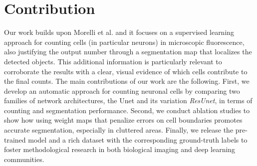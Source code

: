 
\section{Contribution}
\label{sec:contribution}
Our work builds upon Morelli et al. \cite{morelli2021cell_counting} and it focuses on a supervised learning approach for counting cells (in particular neurons) in microscopic fluorescence, also justifying the output number through a segmentation map that localizes the detected objects.  
This additional information is particularly relevant to corroborate the results with a clear, visual evidence of which cells contribute to the final counts.
The main contributions of our work are the following. 
First, we develop an automatic approach for counting neuronal cells by comparing two families of network architectures, the {Unet} and its variation \textit{ResUnet}, in terms of counting and segmentation performance. 
Second, we conduct ablation studies to show how using weight maps that penalize errors on cell boundaries promotes accurate segmentation, especially in cluttered areas.
Finally, we release the pre-trained model and a rich dataset with the corresponding ground-truth labels to foster methodological research in both biological imaging and deep learning communities.